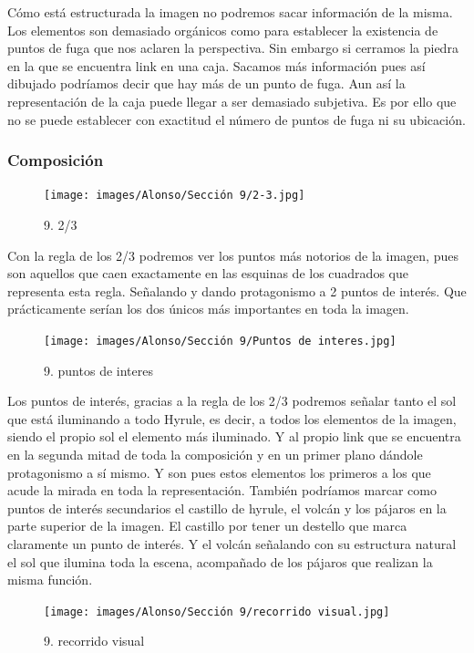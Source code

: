 \documentclass[12pt]{article}
\begin{document}
    Cómo está estructurada la imagen no podremos sacar información de la misma. Los elementos son demasiado orgánicos como para establecer la existencia de puntos de fuga que nos aclaren la perspectiva. Sin embargo si cerramos la piedra en la que se encuentra link en una caja. Sacamos más información pues así dibujado podríamos decir que hay más de un punto de fuga. Aun así la representación de la caja puede llegar a ser demasiado subjetiva. Es por ello que no se puede establecer con exactitud el número de puntos de fuga ni su ubicación.

        \subsubsection{Composición}
    \begin{figure}[H]
      \centering
      \texttt{[image: images/Alonso/Sección 9/2-3.jpg]}
      \caption{\small 9. 2/3}
    \end{figure}
    Con la regla de los 2/3 podremos ver los puntos más notorios de la imagen, pues son aquellos que caen exactamente en las esquinas de los cuadrados que representa esta regla. Señalando y dando protagonismo a 2 puntos de interés. Que prácticamente serían los dos únicos más importantes en toda la imagen.

    \begin{figure}[H]
      \centering
      \texttt{[image: images/Alonso/Sección 9/Puntos de interes.jpg]}
      \caption{\small 9. puntos de interes}
    \end{figure}

    Los puntos de interés, gracias a la regla de los 2/3 podremos señalar tanto el sol que está iluminando a todo Hyrule, es decir, a todos los elementos de la imagen, siendo el propio sol el elemento más iluminado. Y al propio link que se encuentra en la segunda mitad de toda la composición y en un primer plano dándole protagonismo a sí mismo.
    Y son pues estos elementos los primeros a los que acude la mirada en toda la representación. También podríamos marcar como puntos de interés secundarios el castillo de hyrule, el volcán y los pájaros en la parte superior de la imagen. El castillo por tener un destello que marca claramente un punto de interés. Y el volcán señalando con su estructura natural el sol que ilumina toda la escena, acompañado de los pájaros que realizan la misma función.

    \begin{figure}[H]
      \centering
      \texttt{[image: images/Alonso/Sección 9/recorrido visual.jpg]}
      \caption{\small 9. recorrido visual}
    \end{figure}
\end{document}
